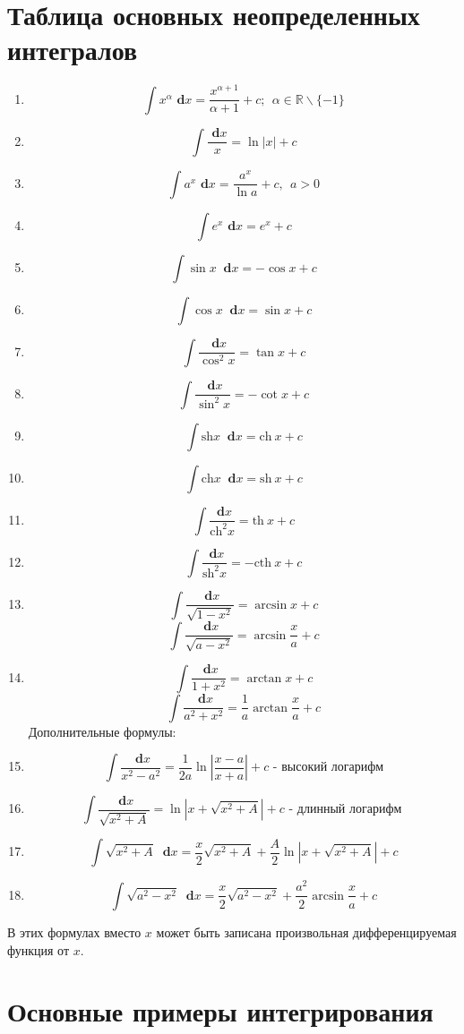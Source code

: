 \documentclass[a4paper,12pt, centered]{bookest}
\theoremstyle{remark}
\newcommand\dx{\textbf{ d}x}
\begin{document}
\section{Таблица основных неопределенных интегралов}
\begin{enumerate}
	\item $$\int x^\alpha \dx=\frac{x^{\alpha+1}}{\alpha+1}+c;\>\>\alpha\in\mathbb{R}\backslash\{-1\}$$
	\item $$\int\frac{\dx}{x}=\ln|x|+c$$
	\item $$\int a^x\dx=\frac{a^x}{\ln a}+c,\>\>a>0$$
	\item $$\int e^x\dx=e^x+c$$
	\item $$\int\sin x\>\dx	=-\cos x+c$$
	\item $$\int\cos x\>\dx=\sin x+c$$
	\item $$\int\frac{\dx}{\cos^2x}=\tan x+c$$
	\item $$\int\frac{\dx}{\sin^2x}=-\cot x+c$$
	\item $$\int\textrm{sh}x\>\dx=\textrm{ch}\>x+c$$
	\item $$\int\textrm{ch}x\>\dx=\textrm{sh}\>x+c$$
	\item $$\int\frac{\dx}{\textrm{ch}^2x}=\textrm{th}\>x+c$$
	\item $$\int\frac{\dx}{\textrm{sh}^2x}=-\textrm{cth}\>x+c$$
	\item $$\int\frac{\dx}{\sqrt{1-x^2}}=\arcsin x+c$$
		$$\int\frac{\dx}{\sqrt{a-x^2}}=\arcsin \frac{x}{a}+c$$
	\item $$\int\frac{\dx}{1+x^2}=\arctan x+c$$
		$$\int\frac{\dx}{a^2+x^2}=\frac{1}{a}\arctan\frac{x}{a}+c$$
		Дополнительные формулы: 
	\item $$\int\frac{\dx}{x^2-a^2}=\frac{1}{2a}\ln|\frac{x-a}{x+a}|+c\textrm{ - высокий логарифм}$$ 
	\item $$\int\frac{\dx}{\sqrt{x^2+A}}=\ln|x+\sqrt{x^2+A}|+c\textrm{ - длинный логарифм }$$
	\item $$\int\sqrt{x^2+A}\>\dx=\frac{x}{2}\sqrt{x^2+A}+\frac{A}{2}\ln|x+\sqrt{x^2+A}|+c$$
	\item $$\int\sqrt{a^2-x^2}\>\dx=\frac{x}{2}\sqrt{a^2-x^2}+\frac{a^2}{2}\arcsin\frac{x}{a}+c$$
\end{enumerate}
В этих формулах вместо $x$ может быть записана произвольная дифференцируемая функция от $x$.
\section{Основные примеры интегрирования}
\end{document}
